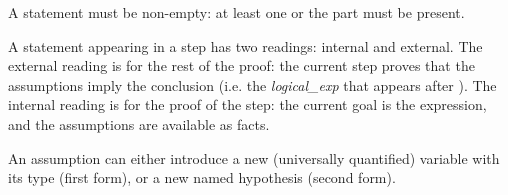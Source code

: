 \begin{syn}
 \is
\end{syn}

A statement must be non-empty: at least one  or the
 part must be present.

A statement appearing in a step has two readings: internal and
external.  The external reading is for the rest of the
proof: the current step proves that the assumptions imply the
conclusion (i.e. the {\em logical\_exp} that appears after
).  The internal reading is for the proof of the step:
the current goal is the  expression, and the
assumptions are available as facts.

\begin{syn}
 \is
      
\alt{} \tok{ :} 
\end{syn}


An assumption can either introduce a new (universally quantified)
variable with its type (first form), or a new named hypothesis (second
form).

\begin{syn}
 \is
\alt {}
\alt {}
\alt {}
\end{syn}

